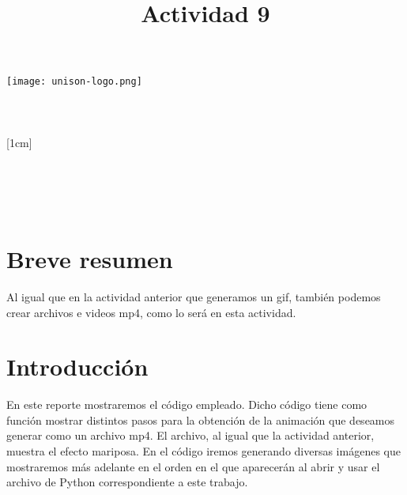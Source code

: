 \documentclass[a4paper,12pt]{article}
\title{Actividad 9}
\author{}
\newcommand{\vacio}{\textcolor{white}{holacaracola}}
\newcommand{\director}{Carlos Lizárraga Celaya}
\begin{document}
\begin{titlepage}
\begin{center}
\vspace{1cm}

\texttt{[image: unison-logo.png]}
\\[0.5cm]
{\fontsize{24}{6}\selectfont{UNIVERSIDAD DE SONORA}}\\
[1em]
{\fontsize{16}{5}\selectfont{DEPARTAMENTO DE FÍSICA}}\\
[4em]
\textcolor{azulportada}
{\fontsize{30}{5}\selectfont{\textsc{\thetitle}}}\\
[1cm]
{\fontsize{16}{5}\selectfont{Alumno:}}\\
[0.2cm]
{\fontsize{14}{5}\selectfont{Luis Alfonso Torres Flores}}\\
[1cm]
{\fontsize{16}{5}\selectfont{Profesor}}\\
[0.2cm]
{\fontsize{16}{5}\selectfont{\director}}\\
[4.5cm]
{\fontsize{14}{5}\selectfont{19 de Mayo de 2017}}\\
[4cm]
\end{center}
\restoregeometry
\end{titlepage}

\newpage
\renewcommand{\headrulewidth}{0.5pt}
\fancyhead[L]{\vacio}
\newpage
\section*{Breve resumen}
\noindent
Al igual que en la actividad anterior que generamos un gif, también podemos crear archivos e videos mp4, como lo será en esta actividad.

\section*{Introducción}
\noindent
En este reporte mostraremos el código empleado. Dicho código tiene como función mostrar distintos pasos para la obtención de la animación que deseamos generar como un archivo mp4. El archivo, al igual que la actividad anterior, muestra el efecto mariposa. En el código iremos generando diversas imágenes que mostraremos más adelante en el orden en el que aparecerán al abrir y usar el archivo de Python correspondiente a este trabajo.
\end{document}

